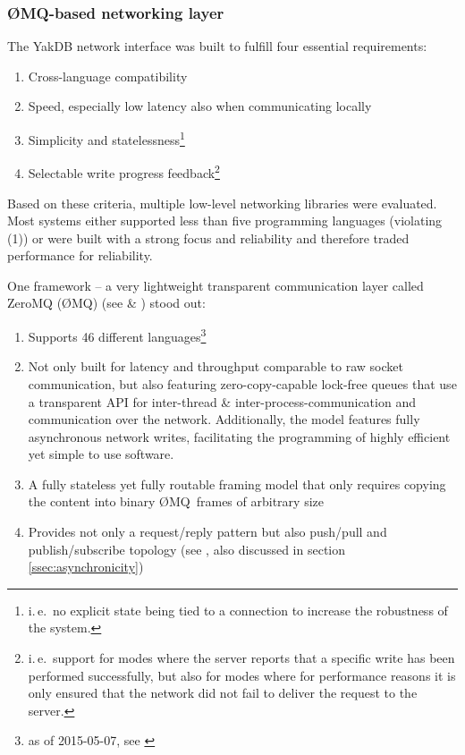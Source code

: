 \documentclass[a4paper, 12pt, twoside, reqn]{report}
\numberwithin{figure}{chapter}
\newtheorem[L]{boxedDefinition}{Definition}
\newtheorem[L]{boxedExample}{Example}
\newcommand{\ie}{i.\,e.\ }
\newcommand{\ZMQ}{{\O}MQ}
\begin{document}
\subsubsection{\ZMQ-based networking layer}\label{ssssec:zmq}
The YakDB network interface was built to fulfill four essential requirements:
\begin{enumerate}[label={(\arabic*)}]
  \item Cross-language compatibility
  \item Speed, especially low latency also when communicating locally
  \item Simplicity and statelessness\footnote{\ie no explicit state being tied to a connection to increase the robustness of the system.}
  \item Selectable write progress feedback\footnote{\ie support for modes where the server reports that a specific write has been performed successfully, but also for modes where for performance reasons it is only ensured that the network did not fail to deliver the request to the server.}
\end{enumerate}

Based on these criteria, multiple low-level networking libraries were evaluated. Most systems either supported less than five programming languages (violating (1)) or were built with a strong focus and reliability and therefore traded performance for reliability.
 
 One framework -- a very lightweight transparent communication layer called ZeroMQ (\ZMQ) (see \cite{hintjens2013zeromq} \& \cite{zmq-homepage}) stood out:
  \begin{enumerate}[label={(\arabic*)}]
  \item Supports 46 different languages\footnote{as of 2015-05-07, see \cite{zmq-language-bindings}} 
  \item Not only built for latency and throughput comparable to raw socket communication, but also featuring zero-copy-capable lock-free queues that use a transparent API for inter-thread \& inter-process-communication and communication over the network. Additionally, the model features fully asynchronous network writes, facilitating the programming of highly efficient yet simple to use software.
  \item A fully stateless yet fully routable framing model that only requires copying the content into binary \ZMQ\ frames of arbitrary size
  \item Provides not only a request/reply pattern but also push/pull and publish/subscribe topology (see \cite{hintjens2013zeromq}, also discussed in section \ref{ssec:asynchronicity})
 \end{enumerate}
\end{document}
